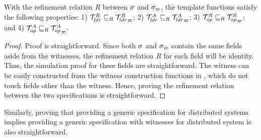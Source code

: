 \begin{theorem}\label{thm:spec-refine}
With the refinement relation $R$ between $\sigma$ and $\sigma_\varpi$, 
the template functions satisfy the following properties:
1) $\mathcal{T}^{R}_{ldr}  \sqsubseteq_{R} {\mathcal{T}^{R}_{ldr}}_{\varpi} $; 
2) $\mathcal{T}^{A}_{ldr}  \sqsubseteq_{R} {\mathcal{T}^{A}_{ldr}}_{\varpi} $; 
3) $\mathcal{T}^{R}_{op}  \sqsubseteq_{R} {\mathcal{T}^{R}_{op}}_{\varpi} $; and
4) $\mathcal{T}^{A}_{op}  \sqsubseteq_{R} {\mathcal{T}^{A}_{op}}_{\varpi}$.
\end{theorem}
\vspace{-0.2em}

\begin{proof}
Proof is straightforward. 
Since both $\sigma$ and $\sigma_\varpi$ contain the same fields aside from
the witnesses, the refinement relation $R$ for each field will be identity.
Thus, the simulation proof for these fields are straightforward. 
The witness can be easily constructed from the witness construction functions
in , which do not touch fields other
than the witness. 
Hence, proving the refinement relation between the two specifications is
straightforward.
\end{proof}

Similarly, proving that providing a generic specification for distributed
systems implies providing a generic specification with witnesses for distributed
system is also straightforward.


